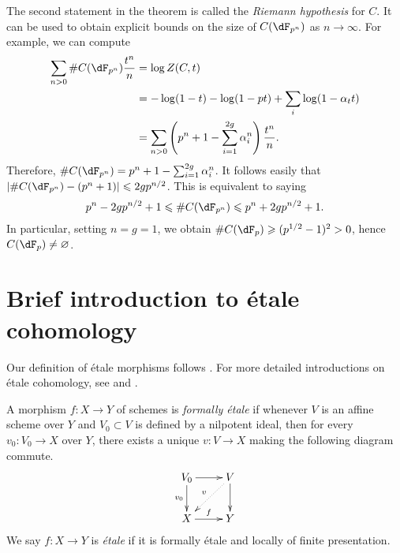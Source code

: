 \documentclass{article}
\begin{document}
The second statement in the theorem is called the \emph{Riemann hypothesis} 
for $C$. It can be used to obtain explicit bounds on the size of 
$C(\dF_{p^n})$ as $n\to\infty$. For example, we can compute 
\begin{align*}
  \sum_{n>0} \# C(\dF_{p^n}) \frac{t^n}{n} 
    &= \log Z(C,t) \\
    &= -\log(1-t) - \log(1-p t) + \sum_i \log(1-\alpha_t t) \\
    &= \sum_{n>0} \left(p^n+1-\sum_{i=1}^{2 g} \alpha_i^n\right) \frac{t^n}{n} \text{.}
\end{align*}
Therefore, $\# C(\dF_{p^n}) = p^n+1-\sum_{i=1}^{2 g} \alpha_i^n$. It 
follows easily that $|\# C(\dF_{p^n})-(p^n+1)| \leqslant 2 g p^{n/2}$. 
This is equivalent to saying 
\[
  p^n-2 g p^{n/2}+1 
    \leqslant \# C(\dF_{p^n}) 
    \leqslant p^n + 2 g p^{n/2} + 1 \text{.}
\]
In particular, setting $n = g = 1$, we obtain 
$\# C(\dF_p) \geqslant (p^{1/2}-1)^2>0$, hence 
$C(\dF_p)\ne\varnothing$. 

























\appendix
\section{Brief introduction to \'etale cohomology}

Our definition of \'etale morphisms follows \cite[17.1]{ega4}. For more 
detailed introductions on \'etale cohomology, see \cite{mi-ec} and \cite{de77}. 





\begin{definition}
A morphism $f:X\to Y$ of schemes is \emph{formally \'etale} if whenever 
$V$ is an affine scheme over $Y$ and $V_0\subset V$ is defined by a nilpotent 
ideal, then for every $v_0:V_0 \to X$ over $Y$, there exists a unique 
$v:V\to X$ making the following diagram commute. 
\[\xymatrix{
  V_0 \ar[r] \ar[d]_-{v_0} 
    & V \ar[d] \ar@{.>}[dl]_-v \\
  X \ar[r]^-f 
    & Y
}\]
We say $f:X\to Y$ is \emph{\'etale} if it is formally \'etale and locally of 
finite presentation. 
\end{definition}
\end{document}
